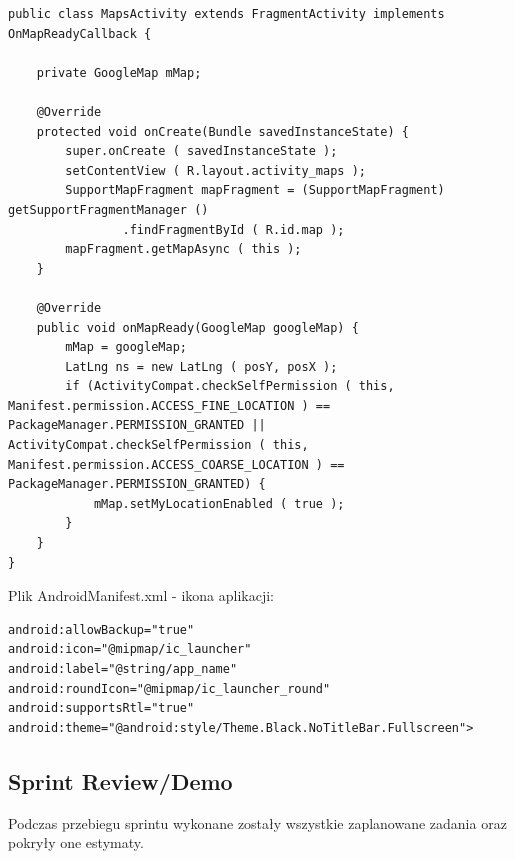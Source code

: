 \documentclass[a4paper]{article}
\begin{document}
\begin{lstlisting}[style=java]
public class MapsActivity extends FragmentActivity implements OnMapReadyCallback {

    private GoogleMap mMap;

    @Override
    protected void onCreate(Bundle savedInstanceState) {
        super.onCreate ( savedInstanceState );
        setContentView ( R.layout.activity_maps );
        SupportMapFragment mapFragment = (SupportMapFragment) getSupportFragmentManager ()
                .findFragmentById ( R.id.map );
        mapFragment.getMapAsync ( this );
    }

    @Override
    public void onMapReady(GoogleMap googleMap) {
        mMap = googleMap;
		LatLng ns = new LatLng ( posY, posX );
		if (ActivityCompat.checkSelfPermission ( this, Manifest.permission.ACCESS_FINE_LOCATION ) == PackageManager.PERMISSION_GRANTED || ActivityCompat.checkSelfPermission ( this, Manifest.permission.ACCESS_COARSE_LOCATION ) == PackageManager.PERMISSION_GRANTED) {
			mMap.setMyLocationEnabled ( true );
		}
	}
}
\end{lstlisting}

Plik AndroidManifest.xml - ikona aplikacji:
\begin{lstlisting}[style=xml]
android:allowBackup="true"
android:icon="@mipmap/ic_launcher"
android:label="@string/app_name"
android:roundIcon="@mipmap/ic_launcher_round"
android:supportsRtl="true"
android:theme="@android:style/Theme.Black.NoTitleBar.Fullscreen">
\end{lstlisting}

\subsection{Sprint Review/Demo}
Podczas przebiegu sprintu wykonane zostały wszystkie zaplanowane zadania oraz pokryły one estymaty.
\end{document}
